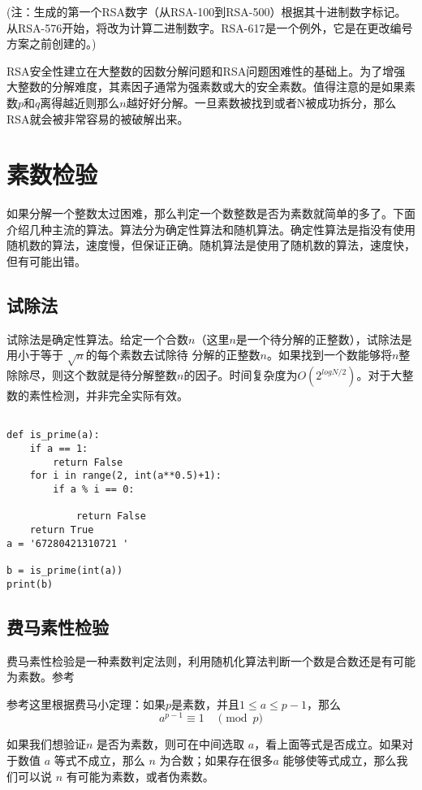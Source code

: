 \documentclass{article}
\begin{document}
(注：生成的第一个RSA数字（从RSA-100到RSA-500）根据其十进制数字标记。从RSA-576开始，将改为计算二进制数字。RSA-617是一个例外，它是在更改编号方案之前创建的。)

RSA安全性建立在大整数的因数分解问题和RSA问题困难性的基础上。为了增强大整数的分解难度，其素因子通常为强素数或大的安全素数。值得注意的是如果素数$p$和$q$离得越近则那么$n$越好好分解。一旦素数被找到或者N被成功拆分，那么RSA就会被非常容易的被破解出来。

\section{素数检验}

如果分解一个整数太过困难，那么判定一个数整数是否为素数就简单的多了。下面介绍几种主流的算法。算法分为确定性算法和随机算法。确定性算法是指没有使用随机数的算法，速度慢，但保证正确。随机算法是使用了随机数的算法，速度快，但有可能出错。

\subsection{试除法}
试除法是确定性算法。给定一个合数$n$（这里$n$是一个待分解的正整数），试除法是用小于等于 $\sqrt{n}$的每个素数去试除待
分解的正整数$n$。如果找到一个数能够将$n$整除除尽，则这个数就是待分解整数$n$的因子。时间复杂度为$O(2^{log{N}/2})$。对于大整数的素性检测，并非完全实际有效。

\begin{lstlisting}

def is_prime(a):
    if a == 1: 
        return False
    for i in range(2, int(a**0.5)+1):
        if a % i == 0: 
    
            return False
    return True
a = '67280421310721	'

b = is_prime(int(a))
print(b)
\end{lstlisting}

\subsection{费马素性检验}
费马素性检验是一种素数判定法则，利用随机化算法判断一个数是合数还是有可能为素数。参考\href{https://blog.csdn.net/joker_clown/article/details/101054453}{\color{blue}{这里}} 

参考这里根据费马小定理：如果$p$是素数，并且$1 \leq a \leq p- 1$，那么
$$a^{p - 1} \equiv 1 \quad \pmod{p}$$

如果我们想验证$ n$ 是否为素数，则可在中间选取 $a$，看上面等式是否成立。如果对于数值 $a$ 等式不成立，那么 $n$ 为合数；如果存在很多$a$ 能够使等式成立，那么我们可以说 $n$ 有可能为素数，或者伪素数。
\end{document}
